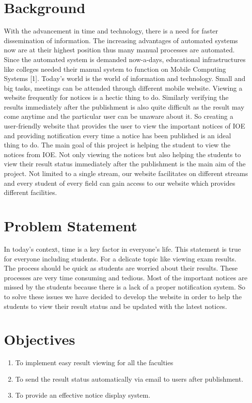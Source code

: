 \section{Background}\label{sec:bkgrnd}%
 With the advancement in time and technology, there is a need for faster dissemination of information. The increasing advantages of automated systems now are at their highest position thus many manual processes are automated. Since the automated system is demanded now-a-days, educational infrastructures like colleges needed their manual system to function on Mobile Computing Systems [1]. Today's world is the world of information and technology. Small and big tasks, meetings can be attended through different mobile website. Viewing a website frequently for notices is a hectic thing to do. Similarly verifying the results immediately after the publishment is also quite difficult as the result may come anytime and the particular user can be unaware about it.
So creating a user-friendly website that provides the user to view the important notices of IOE and providing notification every time a notice has been published is an ideal thing to do. The main goal of this project is helping the student to view the notices from IOE. Not only viewing the notices but also helping the students to view their result status immediately after the publishment is the main aim of the project. Not limited to a single stream, our website facilitates on different streams and every student of every field can gain access to our website which provides different facilities.


  
\section{Problem Statement}
In today's context, time is a key factor in everyone’s life. This statement is true for everyone including students. For a delicate topic like viewing exam results. The process should be quick as students are worried about their results. These processes are very time consuming and tedious. Most of the important notices are missed by the students because there is a lack of a proper notification system. So to solve these issues we have decided to develop the website in order to help the students to view their result status and be updated with the latest notices.

\section{Objectives}
\begin{enumerate}
    \item 	To implement easy result viewing for all the faculties


    \item To send the result status automatically via email to users after publishment.
    \item To provide an effective notice display system.
\end{enumerate}

